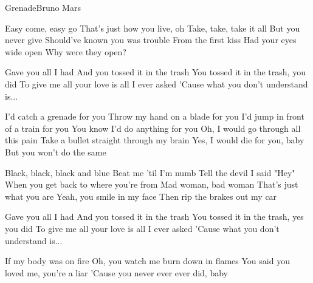 \documentclass[a4paper,11pt,french]{article}
\begin{document}

\begin{Song}{Grenade}{Bruno Mars}
\begin{multicols}{2}
\begin{Verse}
Easy come, easy go
That's just how you live, oh
Take, take, take it all
But you never give
Should've known you was trouble
From the first kiss
Had your eyes wide open
Why were they open?
\end{Verse}
\espaceInterStrophe

\begin{PreChorus}
Gave you all I had
And you tossed it in the trash
You tossed it in the trash, you did
To give me all your love is all I ever asked
'Cause what you don't understand is...
\end{PreChorus}
\espaceInterStrophe

\begin{Chorus}
I'd catch a grenade for you 
Throw my hand on a blade for you 
I'd jump in front of a train for you 
You know I'd do anything for you 
Oh, I would go through all this pain
Take a bullet straight through my brain
Yes, I would die for you, baby
But you won't do the same
\end{Chorus}
\vfill
\columnbreak

\begin{Verse}
Black, black, black and blue
Beat me 'til I'm numb
Tell the devil I said "Hey" 
When you get back to where you're from
Mad woman, bad woman
That's just what you are
Yeah, you smile in my face 
Then rip the brakes out my car
\end{Verse}
\espaceInterStrophe

\begin{PreChorus}
Gave you all I had
And you tossed it in the trash
You tossed it in the trash, yes you did
To give me all your love is all I ever asked
'Cause what you don't understand is...
\end{PreChorus}
\espaceInterStrophe

\tochorus
\espaceInterStrophe

\begin{Bridge}
If my body was on fire
Oh, you watch me burn down in flames
You said you loved me, you're a liar
'Cause you never ever ever did, baby
\end{Bridge}
\espaceInterStrophe


\end{multicols}
\end{Song}
\end{document}

